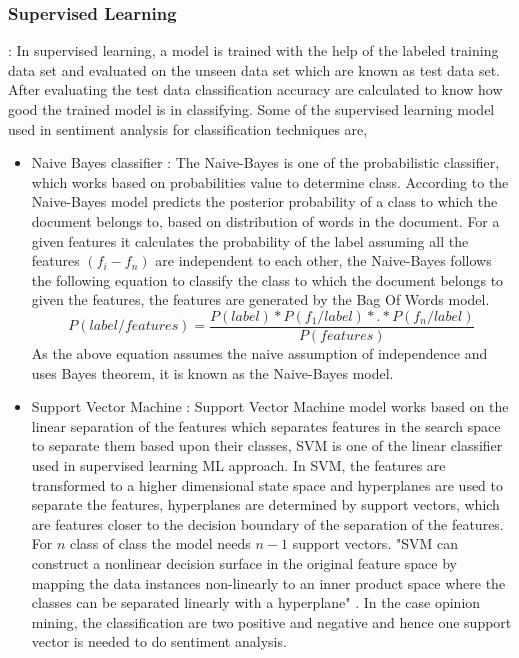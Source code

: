 \documentclass[sigconf]{acmart}
\begin{document}
\subsubsection*{Supervised Learning} : In supervised learning, a model is trained with the help of the labeled training data set and evaluated on the unseen data set which are known as test data set. After evaluating the test data classification accuracy are calculated to know how good the trained model is in classifying. Some of the supervised learning model used in sentiment analysis for classification techniques are,
\begin{itemize}
    \item Naive Bayes classifier : The Naive-Bayes is one of the probabilistic classifier, which works based on probabilities value to determine class. According to \cite{sentianalysis} the Naive-Bayes model predicts the posterior probability of a class to which the document belongs to, based on distribution of words in the document. For a given features it calculates the probability of the label assuming all the features $(f_i-f_n)$ are independent to each other, the Naive-Bayes follows the following equation to classify the class to which the document belongs to given the features, the features are generated by the Bag Of Words model.
    \begin{equation*}
        P(label/features) = \frac{P(label)*P(f_{1}/label)*.*P(f_{n}/label)}{P(features)}
    \end{equation*}
    As the above equation assumes the naive assumption of independence and uses Bayes theorem, it is known as the Naive-Bayes model.
    
    \item Support Vector Machine : Support Vector Machine model works based on the linear separation of the features which separates features in the search space to separate them based upon their classes, SVM is one of the linear classifier used in supervised learning ML approach. In SVM, the features are transformed to a higher dimensional state space and hyperplanes are used to separate the features, hyperplanes are determined by support vectors, which are features closer to the decision boundary of the separation of the features. For $n$ class of class the model needs $n-1$ support vectors. "SVM can construct a nonlinear decision surface in the original feature space by mapping the data instances non-linearly to an inner product space where the classes can be separated linearly with a hyperplane" \cite{sentianalysis}. In the case opinion mining, the classification are two positive and negative and hence one support vector is needed to do sentiment analysis.
    

\end{itemize}
\end{document}
